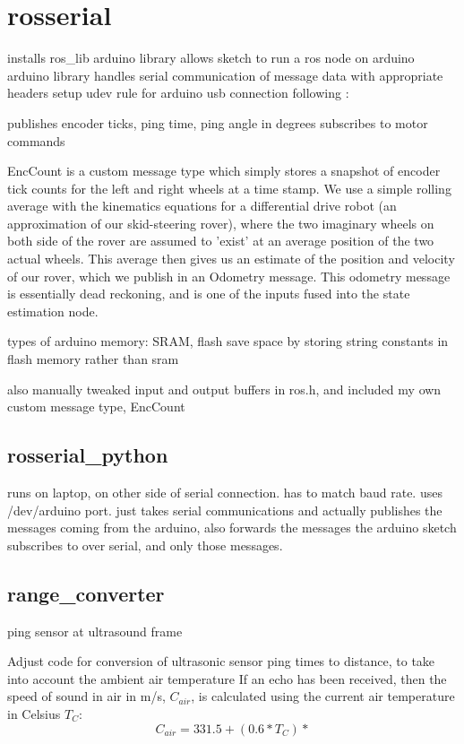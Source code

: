 \section{rosserial}
installs ros\_lib arduino library
allows sketch to run a ros node on arduino
arduino library handles serial communication of message data with appropriate headers
setup udev rule for arduino usb connection following : %

publishes encoder ticks, ping time, ping angle in degrees
subscribes to motor commands

EncCount is a custom message type which simply stores a snapshot of encoder
tick counts for the left and right wheels at a time stamp. We use a simple
rolling average with the kinematics equations for a differential drive
robot (an approximation of our skid-steering rover), where the two imaginary
wheels on both side of the rover are assumed to 'exist' at an average position
of the two actual wheels. This average then gives us an estimate of the
position and velocity of our rover, which we publish in an Odometry message.
This odometry message is essentially dead reckoning, and is one of the inputs
fused into the state estimation node. 

types of arduino memory: SRAM, flash
save space by storing string constants in flash memory rather than sram

also manually tweaked input and output buffers in ros.h, and included my own custom message type, EncCount

\subsection{rosserial\_python}
runs on laptop, on other side of serial connection. has to match baud rate. uses /dev/arduino port. just takes serial communications and actually publishes the messages coming from the arduino, also forwards the messages the arduino sketch subscribes to over serial, and only those messages.

\subsection{range\_converter}
ping sensor at ultrasound frame

Adjust code for conversion of ultrasonic sensor ping times to distance, to take into account the ambient air temperature
If an echo has been received, then the speed of sound in air in m/s, \(C_{air}\), is calculated using the current air temperature in Celsius \(T_C\):
\[C_{air} = 331.5 + (0.6 * T_C)*\]

